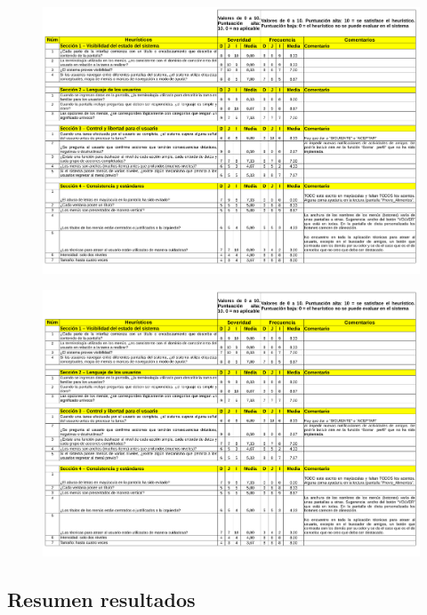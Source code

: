 \documentclass[a4paper]{article}
\begin{document}
\begin{figure}[!h]
\centering
\includegraphics[width=0.9\textheight,angle=90,page=2,clip=true,trim=0 3cm 0 0]{./figuras/checklist.pdf}
\end{figure}

\begin{figure}[!h]
\centering
\includegraphics[width=0.9\textheight,angle=90,page=3,clip=true,trim=0 14cm 0 0]{./figuras/checklist.pdf}
\end{figure}
\FloatBarrier

\subsection{Resumen resultados}
\end{document}
